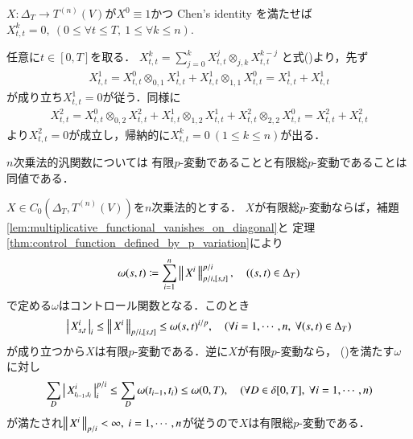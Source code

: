 	\begin{screen}
		\begin{lem}\label{lem:multiplicative_functional_vanishes_on_diagonal}
			$X:\Delta_T \longrightarrow T^{(n)}(V)$が$X^0 \equiv 1$かつ
			Chen's identity を満たせば$X^k_{t,t} = 0,
			\ (0 \leq \forall t \leq T,\ 1 \leq \forall k \leq n)$.
		\end{lem}
	\end{screen}
	
	\begin{prf}
		任意に$t \in [0,T]$を取る．
		$X^k_{t,t} = \sum_{j=0}^{k} X^j_{t,t} \otimes_{j,k} X^{k-j}_{t,t}$
		と式()より，先ず
		\begin{align}
			X^1_{t,t} = X^0_{t,t} \otimes_{0,1} X^1_{t,t} + X^1_{t,t} \otimes_{1,1} X^0_{t,t}
			= X^1_{t,t} + X^1_{t,t}
		\end{align}
		が成り立ち$X^1_{t,t} = 0$が従う．同様に
		\begin{align}
			X^2_{t,t} = X^0_{t,t} \otimes_{0,2} X^2_{t,t} + X^1_{t,t} \otimes_{1,2} X^1_{t,t}
				+ X^2_{t,t} \otimes_{2,2} X^0_{t,t}
			= X^2_{t,t} + X^2_{t,t}
		\end{align}
		より$X^2_{t,t} = 0$が成立し，帰納的に$X^k_{t,t} = 0\ (1 \leq k \leq n)$が出る．
		\QED
	\end{prf}
	
	\begin{screen}
		\begin{thm}\label{thm:fin_p_var_and_fin_ttl_p_var_is_equiv_for_multiplicative}
			$n$次乗法的汎関数については
			有限$p$-変動であることと有限総$p$-変動であることは同値である．
		\end{thm}
	\end{screen}
	
	\begin{prf}
		$X \in C_0 \left(\Delta_T,T^{(n)}(V) \right)$を$n$次乗法的とする．
		$X$が有限総$p$-変動ならば，補題\ref{lem:multiplicative_functional_vanishes_on_diagonal}と
		定理\ref{thm:control_function_defined_by_p_variation}により
		\begin{align}
			\omega(s,t) \coloneqq \sum_{i=1}^n \left\|\, X^i\, \right\|_{p/i,[s,t]}^{p/i},
			\quad ((s,t) \in \Delta_T)
		\end{align}
		で定める$\omega$はコントロール関数となる．このとき
		\begin{align}
			\left|\, X^i_{s,t}\, \right|_{i}
			\leq \left\|\, X^i\, \right\|_{p/i,[s,t]}
			\leq \omega(s,t)^{i/p},
			\quad (\forall i = 1,\cdots,n,\ \forall (s,t) \in \Delta_T)
		\end{align}
		が成り立つから$X$は有限$p$-変動である．逆に$X$が有限$p$-変動なら，
		()を満たす$\omega$に対し
		\begin{align}
			\sum_D \left|\, X^i_{t_{i-1},t_i}\, \right|_{i}^{p/i}
			\leq \sum_D \omega(t_{i-1},t_i)
			\leq \omega(0,T),
			\quad (\forall D \in \delta[0,T],\ \forall i=1,\cdots,n)
		\end{align}
		が満たされ$\Norm{X^i}{p/i} < \infty,\ i=1,\cdots,n$が従うので$X$は有限総$p$-変動である．
		\QED
	\end{prf}
	
